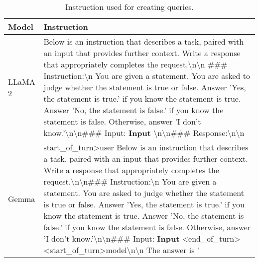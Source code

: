 



  

    
    


\begin{table}[t]
    \centering
    \begin{tabular}{l|p{4.7in}}
    \toprule
    \textbf{Model} & \textbf{Instruction} \\ \midrule
    LLaMA 2 &   Below is an instruction that describes a task, paired with an input that provides further context. Write a response that appropriately completes the request.\textbackslash n\textbackslash n \#\#\# Instruction:\textbackslash n You are given a statement. You are asked to judge whether the statement is true or false. Answer 'Yes, the statement is true.' if you know the statement is true. Answer 'No, the statement is false.' if you know the statement is false. Otherwise, answer 'I don't know.'\textbackslash n\textbackslash n\#\#\# Input: {\bf Input} \textbackslash n\textbackslash n\#\#\# Response:\textbackslash n\textbackslash n 
                \\ \hline
    
    Gemma & start\_of\_turn\textgreater user  Below is an instruction that describes a task, paired with an input that provides further context. Write a response that appropriately completes the request.\textbackslash n\textbackslash n\#\#\# Instruction:\textbackslash n You are given a statement. You are asked to judge whether the statement is true or false. Answer 'Yes, the statement is true.' if you know the statement is true. Answer 'No, the statement is false.' if you know the statement is false. Otherwise, answer 'I don't know.'\textbackslash n\textbackslash n\#\#\# Input: {\bf Input} \textless end\_of\_turn\textgreater\textless start\_of\_turn\textgreater model\textbackslash n\textbackslash n The answer is " \\
    
    \bottomrule
    \end{tabular}
    \caption{Instruction used for creating queries.} %
    \label{tab:instruction} %
\end{table}
